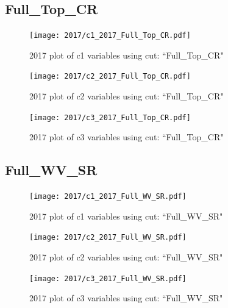 \documentclass{article}
\begin{document}
      \subsection*{Full\_Top\_CR}
                        \begin{figure}[H]
                            \centering
                            \caption{2017 plot of c1 variables using cut: ``Full\_Top\_CR"}
                            \texttt{[image: 2017/c1\_2017\_Full\_Top\_CR.pdf]}
                        \end{figure}    
                        \begin{figure}[H]
                            \centering
                            \caption{2017 plot of c2 variables using cut: ``Full\_Top\_CR"}
                            \texttt{[image: 2017/c2\_2017\_Full\_Top\_CR.pdf]}
                        \end{figure}    
                        \begin{figure}[H]
                            \centering
                            \caption{2017 plot of c3 variables using cut: ``Full\_Top\_CR"}
                            \texttt{[image: 2017/c3\_2017\_Full\_Top\_CR.pdf]}
                        \end{figure}    
      \subsection*{Full\_WV\_SR}
                        \begin{figure}[H]
                            \centering
                            \caption{2017 plot of c1 variables using cut: ``Full\_WV\_SR"}
                            \texttt{[image: 2017/c1\_2017\_Full\_WV\_SR.pdf]}
                        \end{figure}    
                        \begin{figure}[H]
                            \centering
                            \caption{2017 plot of c2 variables using cut: ``Full\_WV\_SR"}
                            \texttt{[image: 2017/c2\_2017\_Full\_WV\_SR.pdf]}
                        \end{figure}    
                        \begin{figure}[H]
                            \centering
                            \caption{2017 plot of c3 variables using cut: ``Full\_WV\_SR"}
                            \texttt{[image: 2017/c3\_2017\_Full\_WV\_SR.pdf]}
                        \end{figure}    
\end{document}
